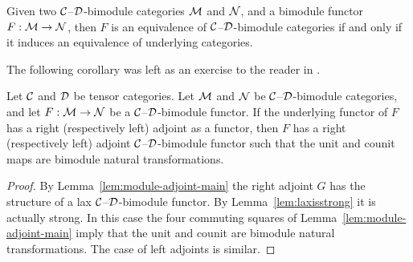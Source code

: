 \documentclass{amsart}
\begin{document}
\begin{corollary}\label{cor:Recog_equiv_of_bimod}
	Given two $\mathcal C$--$\mathcal D$-bimodule categories $\mathcal M$ and $\mathcal N$, and a bimodule functor $F:\mathcal M \to \mathcal N$, then $F$ is an equivalence of $\mathcal C$--$\mathcal D$-bimodule categories if and only if it induces an equivalence of underlying categories.
\end{corollary}

%	

The following corollary was left as an exercise to the reader in \cite[\S 3.3]{EO-ftc}.
\begin{corollary} \label{cor:module-adjoint}
Let $\mathcal C$ and $\mathcal D$ be tensor categories. Let  $\mathcal M$ and  $\mathcal N$  be  $\mathcal C$--$\mathcal D$-bimodule categories, and let $F: \mathcal M \to \mathcal N$ be a $\mathcal C$--$\mathcal D$-bimodule functor.  If the underlying functor of $F$ has a right (respectively left) adjoint as a functor, then $F$ has a right (respectively left) adjoint $\mathcal C$--$\mathcal D$-bimodule functor such that the unit and counit maps are bimodule natural transformations.
\end{corollary}

\begin{proof}
	By Lemma~\ref{lem:module-adjoint-main} the right adjoint $G$ has the structure of a lax $\mathcal C$--$\mathcal D$-bimodule functor. By Lemma~\ref{lem:laxisstrong} it is actually strong. In this case the four commuting squares of Lemma~\ref{lem:module-adjoint-main} imply that the unit and counit are bimodule natural transformations. The case of left adjoints is similar. 
\end{proof}
\end{document}
